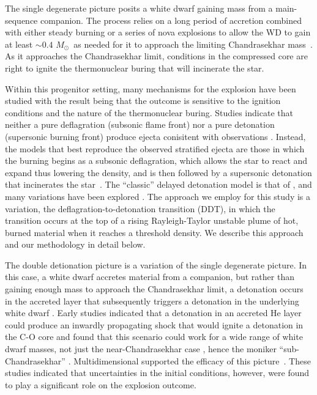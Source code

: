 \documentclass[iop,apj]{emulateapj}
\newcommand{\Msun}{\ensuremath{M_\odot}}
\begin{document}
The single degenerate picture posits a white dwarf gaining mass
from a main-sequence companion. The process relies on a long
period of accretion combined with either steady burning or a 
series of nova explosions to allow the WD to gain at least
$\sim 0.4$ \Msun\ as needed for it to approach the
limiting Chandrasekhar mass~\citep{starrfieldetal2012}. As it approaches
the Chandrasekhar limit, conditions in the compressed core are right
to ignite the thermonuclear buring that will incinerate the star. 

Within this progenitor setting, many mechanisms for the explosion have 
been studied with the result being that the outcome is sensitive to
the ignition conditions and the nature of the thermonuclear buring.
Studies indicate that neither a pure deflagration (subsonic flame front)
nor a pure detonation (supersonic burning front) produce ejecta conisitent
with observations \citep{arnett69,roepkeetal07}.  Instead, the models 
that best reproduce the observed stratified ejecta are those in which 
the burning begins as a subsonic deflagration, which allows the star 
to react and expand thus lowering the density, and is then followed by a 
supersonic detonation that incinerates the 
star~\citep{Nomo84,Khokhlov1991Delayed-detonat,HoefKhok96,GameKhokOran05}.
The ``classic'' delayed detonation model is that of 
\citet{Khokhlov1991Delayed-detonat} \citep[See also][]{hoflich.khokhlov.ea:delayed,GameKhokOran05},
and many variations have been 
explored \citep[and references therein]{hillebrandtetal2013,calderetal2013}.
The approach we employ for this study is a variation, the 
deflagration-to-detonation transition (DDT), in which the transition
occurs at the top of a rising Rayleigh-Taylor unstable plume of hot, burned 
material when it reaches a threshold density.
We describe this approach and our methodology in detail below.

The double detionation picture is a variation of the single degenerate picture.
In this case, a white dwarf accretes material from a companion, but rather
than gaining enough mass to approach the Chandrasekhar limit, a detonation
occurs in the accreted layer that subsequently triggers a detonation
in the underlying white dwarf \citet{woosleyweavertaam80,taam80a,taam80b,
nomoto80,nomoto82b}. Early studies indicated that a detonation in an 
accreted He
layer could produce an inwardly propagating
shock that would ignite a detonation in the C-O core and found
that this scenario could work for a wide range of white dwarf
masses, not just the near-Chandrasekhar case \citep{livne90}, hence the
moniker ``sub-Chandrasekhar'' \citep{ww94}. Multidimensional supported the
efficacy of this picture~\citep{livneglasner91, livnearnett95,HoefKhok96,
hoeflichetal96, wigginsfalle97,wigginsetal98,garciasenzbravowoosley99}. 
These studies indicated that uncertainties in the initial conditions, 
however, were found to play a significant role on the explosion outcome. 
\end{document}
